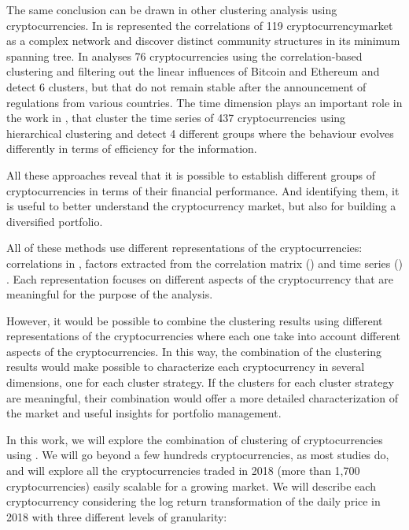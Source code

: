 \documentclass{bmcart}
\begin{document}
The same conclusion can be drawn in other clustering analysis using cryptocurrencies. In \cite{Stosic2018CollectiveBO} is represented the correlations of 119 cryptocurrencymarket as a complex network and discover distinct community structures in its minimum spanning tree. In \cite{Song2019} analyses 76 cryptocurrencies using the correlation-based clustering and filtering out the linear influences of Bitcoin and Ethereum and detect 6 clusters, but that do not remain stable after the announcement of regulations from various countries. The time dimension plays an important role in the work in \cite{HigorSigakiClusteringPattersCrypto2018}, that cluster the time series of 437 cryptocurrencies using hierarchical clustering and detect 4 different groups where the behaviour evolves differently in terms of efficiency for the information.

All these approaches reveal that it is possible to establish  different groups of cryptocurrencies in terms of their financial performance. And identifying them, it is useful to better understand the cryptocurrency market, but also for building a diversified  portfolio. 

All of these methods use different representations of the cryptocurrencies: correlations in \cite{Stosic2018CollectiveBO, Song2019}, factors extracted from the correlation matrix  (\cite{Pele2020}) and time series (\cite{HigorSigakiClusteringPattersCrypto2018}) . Each representation focuses on different aspects of the cryptocurrency that are meaningful for the purpose of the analysis. 

However, it would be possible to combine the clustering results using different representations of the cryptocurrencies where each one take into account different aspects of the cryptocurrencies. In this way, the combination of the clustering results would make possible to characterize each cryptocurrency in several dimensions, one for each cluster strategy. If the clusters for each cluster strategy are meaningful, their combination would offer a more detailed characterization of the market and useful insights for portfolio management.

In this work, we will explore the combination of clustering of cryptocurrencies using  \cite{R_opensourcelanguage}. We will go beyond a few hundreds cryptocurrencies, as most studies do, and will explore all the cryptocurrencies traded in 2018 (more than 1,700 cryptocurrencies) easily scalable for a growing market. We will describe each cryptocurrency considering the log return transformation of the daily price  in 2018 with three different levels of granularity: 
\end{document}
